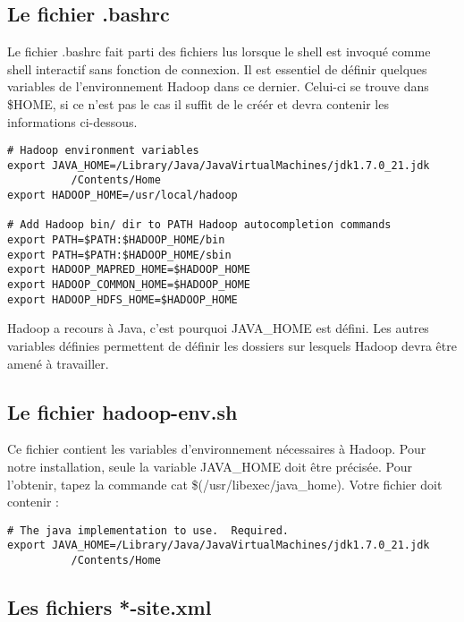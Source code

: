 \subsection{Le fichier .bashrc}

\par Le fichier .bashrc fait parti des fichiers lus lorsque le shell est invoqué comme shell interactif sans fonction de connexion. Il est essentiel de définir quelques variables de l'environnement Hadoop dans ce dernier. Celui-ci se trouve dans \$HOME, si ce n'est pas le cas il suffit de le créér et devra contenir les informations ci-dessous.

\begin{verbatim}
# Hadoop environment variables
export JAVA_HOME=/Library/Java/JavaVirtualMachines/jdk1.7.0_21.jdk
		  /Contents/Home
export HADOOP_HOME=/usr/local/hadoop

# Add Hadoop bin/ dir to PATH Hadoop autocompletion commands
export PATH=$PATH:$HADOOP_HOME/bin
export PATH=$PATH:$HADOOP_HOME/sbin
export HADOOP_MAPRED_HOME=$HADOOP_HOME
export HADOOP_COMMON_HOME=$HADOOP_HOME
export HADOOP_HDFS_HOME=$HADOOP_HOME
\end{verbatim}

\par Hadoop a recours à Java, c'est pourquoi JAVA\_HOME est défini. Les autres variables définies permettent de définir les dossiers sur lesquels Hadoop devra être amené à travailler.

\subsection{Le fichier hadoop-env.sh}

\par Ce fichier contient les variables d'environnement nécessaires à Hadoop. Pour notre installation, seule la variable JAVA\_HOME doit être précisée. Pour l'obtenir, tapez la commande cat \$(/usr/libexec/java\_home). Votre fichier doit contenir :

\begin{verbatim}
# The java implementation to use.  Required.
export JAVA_HOME=/Library/Java/JavaVirtualMachines/jdk1.7.0_21.jdk
		  /Contents/Home
\end{verbatim}

\subsection{Les fichiers *-site.xml}

